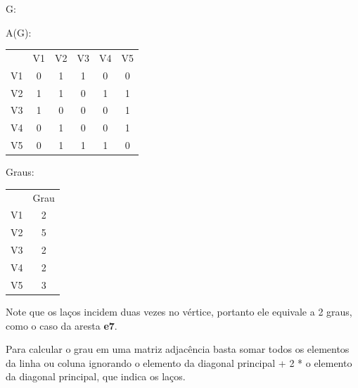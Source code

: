 \documentclass[a4paper, 12pt]{article}
\begin{document}
    \newpage    
    \begin{multicols}{2}
        \begin{center}
        G:
        \end{center}
    
        A(G):
        \begin{tabular}{cccccc}
            & V1 & V2 & V3 & V4 & V5 \\
            V1 & 0  & 1  & 1  & 0  & 0  \\
            V2 & 1  & 1  & 0  & 1  & 1  \\
            V3 & 1  & 0  & 0  & 0  & 1  \\
            V4 & 0  & 1  & 0  & 0  & 1  \\
            V5 & 0  & 1  & 1  & 1  & 0 
        \end{tabular}
        
        \vspace{0.4in}
        Graus:
        \begin{tabular}{cc}
            & Grau \\
            V1 & 2    \\
            V2 & 5    \\
            V3 & 2    \\
            V4 & 2    \\
            V5 & 3   
        \end{tabular}
    \end{multicols}
    
    Note que os laços incidem duas vezes no vértice, portanto ele equivale a 2 graus, como o caso da aresta \textbf{e7}.
    
    \indent Para calcular o grau em uma matriz adjacência basta somar todos os elementos da linha ou coluna ignorando o elemento da diagonal principal + 2 * o elemento da diagonal principal, que indica os laços.
    
\end{document}
